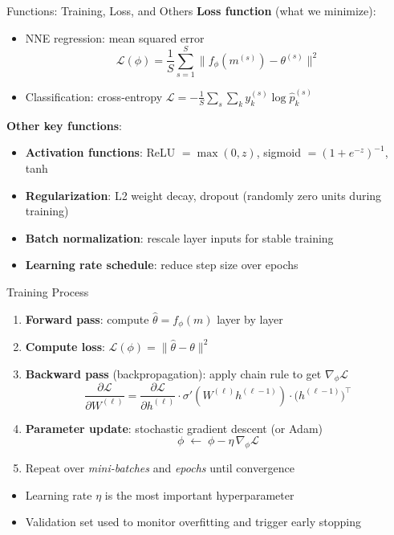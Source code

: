 \documentclass[aspectratio=169,professionalfonts]{beamer}
\newcommand{\hl}[1]{\textbf{\textcolor{UGARed}{#1}}}
\begin{document}
\begin{frame}{Functions: Training, Loss, and Others}
  \hl{Loss function} (what we minimize):
  \begin{itemize}
    \item NNE regression: mean squared error
          \[
            \mathcal{L}(\phi) = \frac{1}{S} \sum_{s=1}^S
                \bigl\| f_\phi(m^{(s)}) - \theta^{(s)} \bigr\|^2
          \]
    \item Classification: cross-entropy $\mathcal{L} = -\frac{1}{S}\sum_s \sum_k y_k^{(s)}\log\hat{p}_k^{(s)}$
  \end{itemize}
  \medskip
  \hl{Other key functions}:
  \begin{itemize}
    \item \textbf{Activation functions}: ReLU $= \max(0,z)$,
          sigmoid $= (1+e^{-z})^{-1}$, tanh
    \item \textbf{Regularization}: L2 weight decay, dropout (randomly zero units during training)
    \item \textbf{Batch normalization}: rescale layer inputs for stable training
    \item \textbf{Learning rate schedule}: reduce step size over epochs
  \end{itemize}
\end{frame}

\begin{frame}{Training Process}
  \begin{enumerate}
    \item \hl{Forward pass}: compute $\hat\theta = f_\phi(m)$ layer by layer
    \item \hl{Compute loss}: $\mathcal{L}(\phi) = \|\hat\theta - \theta\|^2$
    \item \hl{Backward pass} (backpropagation): apply chain rule to get $\nabla_\phi\mathcal{L}$
          \[
            \frac{\partial \mathcal{L}}{\partial W^{(\ell)}}
            = \frac{\partial \mathcal{L}}{\partial h^{(\ell)}}
              \cdot \sigma'\!\left(W^{(\ell)} h^{(\ell-1)}\right)
              \cdot \bigl(h^{(\ell-1)}\bigr)^\top
          \]
    \item \hl{Parameter update}: stochastic gradient descent (or Adam)
          \[
            \phi \;\leftarrow\; \phi - \eta\,\nabla_\phi \mathcal{L}
          \]
    \item Repeat over \textit{mini-batches} and \textit{epochs} until convergence
  \end{enumerate}
  \smallskip
  \begin{itemize}
    \item Learning rate $\eta$ is the most important hyperparameter
    \item Validation set used to monitor overfitting and trigger early stopping
  \end{itemize}
\end{frame}
\end{document}

